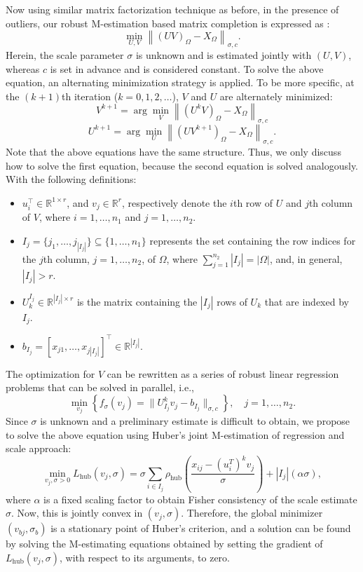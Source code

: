 Now using similar matrix factorization technique as before, in the presence of outliers, our robust M-estimation based matrix completion is expressed as \cite{m-est}:
\[
\min_{U,V} \left\| (UV)_{\Omega} - X_{\Omega} \right\|_{\sigma,c}.
\]
Herein, the scale parameter $\sigma$ is unknown and is estimated jointly with $(U, V)$, whereas $c$ is set in advance and is considered constant. To solve the above equation, an alternating minimization strategy is applied. To be more specific, at the $(k + 1)$th iteration ($k = 0, 1, 2, \ldots$), $V$ and $U$ are alternately minimized:
\[
V^{k+1} = \arg \min_V \left\| (U^kV)_{\Omega} - X_{\Omega} \right\|_{\sigma,c}
\]
\[
U^{k+1} = \arg \min_U \left\| (UV^{k+1})_{\Omega} - X_{\Omega} \right\|_{\sigma,c}.
\]
Note that the above equations have the same structure. Thus, we only discuss how to solve the first equation, because the second equation is solved analogously. With the following definitions:
\begin{itemize}
    \item $u_i^{\top} \in \mathbb{R}^{1 \times r}$, and $v_j \in \mathbb{R}^{r}$, respectively denote the $i$th row of $U$ and $j$th column of $V$, where $i = 1, \ldots, n_1$ and $j = 1, \ldots, n_2$.
    \item $I_j = \{j_1, \ldots, j_{|I_j|}\} \subseteq \{1, \ldots, n_1\}$ represents the set containing the row indices for the $j$th column, $j = 1, \ldots, n_2$, of $\Omega$, where $\sum_{j=1}^{n_2} |I_j| = |\Omega|$, and, in general, $|I_j| > r$.
    \item $U_k^{I_j} \in \mathbb{R}^{|I_j| \times r}$ is the matrix containing the $|I_j|$ rows of $U_k$ that are indexed by $I_j$.
    \item $b_{I_j} = [x_{j1}, \ldots, x_{j|I_j|}]^{\top} \in \mathbb{R}^{|I_j|}$.
\end{itemize}
The optimization for $V$ can be rewritten as a series of robust linear regression problems that can be solved in parallel, i.e.,
\[
\min_{v_j} \left\{ f_{\sigma}(v_j) = \|U^k_{I_j} v_j - b_{I_j}\|_{\sigma,c} \right\}, \quad j = 1, \ldots, n_2.
\]
Since $\sigma$ is unknown and a preliminary estimate is difficult to obtain, we propose to solve the above equation using Huber’s joint M-estimation of regression and scale approach:
\[
\min_{v_j, \sigma > 0} L_{\text{hub}}(v_j, \sigma) = \sigma \sum_{i \in I_j} \rho_{\text{hub}} \left(\frac{x_{ij} - (u_i^T)^k v_j}{\sigma} \right) + |I_j| (\alpha \sigma),
\]
where $\alpha$ is a fixed scaling factor to obtain Fisher consistency of the scale estimate $\sigma$. Now, this is jointly convex in $(v_j, \sigma)$. Therefore, the global minimizer $(v_{bj}, \sigma_b)$ is a stationary point of Huber’s criterion, and a solution can be found by solving the M-estimating equations obtained by setting the gradient of $L_{\text{hub}}(v_j, \sigma)$, with respect to its arguments, to zero.

